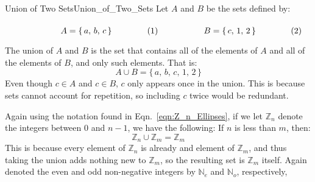         \begin{fexample}{Union of Two Sets}{Union_of_Two_Sets}
            Let $A$ and $B$ be the sets defined by:
            \par\hfill\par
            \begin{subequations}
                \begin{minipage}[b]{0.49\textwidth}
                    \begin{equation}
                        A=\{\,a,\,b,\,c\,\}
                    \end{equation}
                \end{minipage}
                \hfill
                \begin{minipage}[b]{0.49\textwidth}
                    \begin{equation}
                        B=\{\,c,\,1,\,2\,\}
                    \end{equation}
                \end{minipage}
            \end{subequations}
            \par\vspace{2.5ex}
            The union of $A$ and $B$ is the set that contains all of the
            elements of $A$ and all of the elements of $B$, and only such
            elements. That is:
            \begin{equation}
                A\cup{B}=\{\,a,\,b,\,c,\,1,\,2\,\}
            \end{equation}
            Even though $c\in{A}$ and $c\in{B}$, $c$ only appears once in the
            union. This is because sets cannot account for repetition, so
            including $c$ twice would be redundant.
        \end{fexample}
        Again using the notation found in Eqn.~\ref{eqn:Z_n_Ellipses},
        if we let $\mathbb{Z}_{n}$ denote the integers between $0$ and
        $n-1$, we have the following: If $n$ is less than $m$, then:
        \begin{equation}
            \mathbb{Z}_{n}\cup\mathbb{Z}_{m}=\mathbb{Z}_{m}
        \end{equation}
        This is because every element of $\mathbb{Z}_{n}$ is already
        and element of $\mathbb{Z}_{m}$, and thus taking the union adds
        nothing new to $\mathbb{Z}_{m}$, so the resulting set is
        $\mathbb{Z}_{m}$ itself. Again denoted the even and odd non-negative
        integers by $\mathbb{N}_{e}$ and $\mathbb{N}_{o}$, respectively,

